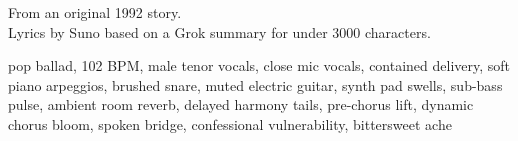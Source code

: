 

\begin{notes}
From an original 1992 story.\\
Lyrics by Suno based on a Grok summary for under 3000 characters.
\end{notes}

\begin{style}
pop ballad, 102 BPM, male tenor vocals, close mic vocals, contained delivery, soft piano arpeggios, brushed snare, muted electric guitar, synth pad swells, sub-bass pulse, ambient room reverb, delayed harmony tails, pre-chorus lift, dynamic chorus bloom, spoken bridge, confessional vulnerability, bittersweet ache
\end{style}

